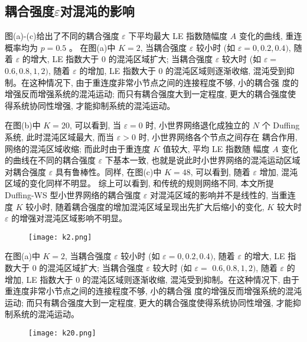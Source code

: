 \subsection*{耦合强度$\varepsilon$对混沌的影响}
图(a)-(c)给出了不同的耦合强度 $\varepsilon$ 下平均最大 LE 指数随幅度 $A$ 变化的曲线, 重连概率均为 $p=0.5$ 。
在图(a)中 $K=2$, 当耦合强度 $\varepsilon$ 较小时 (如 $\varepsilon=0,0.2,0.4)$, 随着 $\varepsilon$ 的增大,
LE 指数大于 0 的混沌区域扩大; 当耦合强度 $\varepsilon$ 较大时 (如 $\varepsilon=$ $0.6,0.8,1,2)$, 
随着 $\varepsilon$ 的增加, LE 指数大于 0 的混沌区域则逐渐收缩, 混沌受到抑制。在这种情况下, 
由于重连度非常小节点之间的连接程度不够, 小的耦合强 度的增强反而增强系统的混沌运动; 而只有耦合强度大到一定程度, 
更大的耦合强度使得系统协同性增强, 才能抑制系统的混沌运动。\par
在图(b)中 $K=20$, 可以看到, 当 $\varepsilon=0$ 时, 小世界网络退化成独立的 $N$ 个 Duffing系统, 此时混沌区域最大, 
而当 $\varepsilon>0$ 时, 小世界网络各个节点之间存在 耦合作用, 网络的混沌区域收缩; 而此时由于重连度 $K$ 值较大, 平均 LE 指数随
幅度 $A$ 变化的曲线在不同的耦合强度 $\varepsilon$ 下基本一致, 也就是说此时小世界网络的混沌运动区域对耦合强度 
$\varepsilon$ 具有鲁棒性。同样, 在图(c)中 $K=48$, 可以看到, 随着 $\varepsilon$ 增加, 混沌区域的变化同样不明显。
综上可以看到, 和传统的规则网络不同, 本文所提 Duffing-WS 型小世界网络的耦合强度 $\varepsilon$ 
对混沌区域的影响并不是线性的, 当重连度 $K$ 较小时, 随着耦合强度的增加混沌区域呈现出先扩大后缩小的变化, 
$K$ 较大时 $\varepsilon$ 的增强对混沌区域影响不明显。\par
\begin{figure}[!htbp]
    \centering
    \texttt{[image: k2.png]}
\end{figure}
在图(a)中 $K=2$, 当耦合强度 $\varepsilon$ 较小时 (如 $\varepsilon=0,0.2,0.4)$, 随着 $\varepsilon$ 的增大,
LE 指数大于 0 的混沌区域扩大; 当耦合强度 $\varepsilon$ 较大时 (如 $\varepsilon=$ $0.6,0.8,1,2)$,
随着 $\varepsilon$ 的增加, LE 指数大于 0 的混沌区域则逐渐收缩, 混沌受到抑制。在这种情况下,
由于重连度非常小节点之间的连接程度不够, 小的耦合强 度的增强反而增强系统的混沌运动; 而只有耦合强度大到一定程度,
更大的耦合强度使得系统协同性增强, 才能抑制系统的混沌运动。\par
\begin{figure}[!htbp]
    \centering
    \texttt{[image: k20.png]}
\end{figure}

